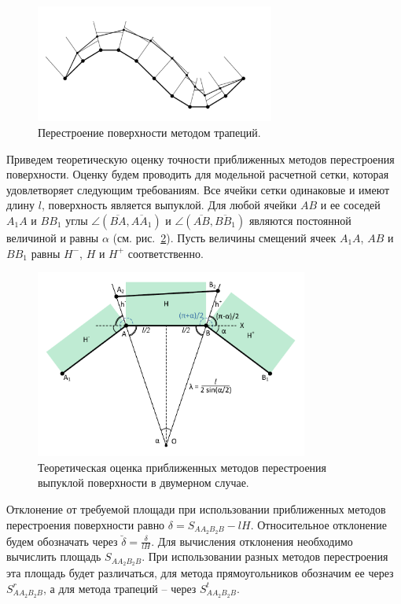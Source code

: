 \begin{figure}[h]
\centering
\includegraphics[width=0.7\textwidth]{pics/text_1_remesh_2d/grid_trapeziums.pdf}
\caption{Перестроение поверхности методом трапеций.}
\label{fig:text_1_remesh_2d_grid_trapeziums}
\end{figure}

Приведем теоретическую оценку точности приближенных методов перестроения поверхности.
Оценку будем проводить для модельной расчетной сетки, которая удовлетворяет следующим требованиям.
Все ячейки сетки одинаковые и имеют длину $l$, поверхность является выпуклой.
Для любой ячейки $AB$ и ее соседей $A_1A$ и $BB_1$ углы $\angle (\overline{BA}, \overline{AA_1})$ и $\angle (\overline{AB}, \overline{BB_1})$ являются постоянной величиной и равны $\alpha$ (см. рис.~\ref{fig:text_1_remesh_2d_theoretical}).
Пусть величины смещений ячеек $A_1A$, $AB$ и $BB_1$ равны $H^{-}$, $H$ и $H^{+}$ соответственно.

\begin{figure}[h]
\centering
\includegraphics[width=0.8\textwidth]{pics/text_1_remesh_2d/theoretical.pdf}
\caption{Теоретическая оценка приближенных методов перестроения выпуклой поверхности в двумерном случае.}
\label{fig:text_1_remesh_2d_theoretical}
\end{figure}

Отклонение от требуемой площади при использовании приближенных методов перестроения поверхности равно $\delta = S_{AA_2B_2B} - lH$.
Относительное отклонение будем обозначать через $\breve{\delta} = \frac{\delta}{lH}$.
Для вычисления отклонения необходимо вычислить площадь $S_{AA_2B_2B}$.
При использовании разных методов перестроения эта площадь будет различаться, для метода прямоугольников обозначим ее через $S_{AA_2B_2B}^r$, а для метода трапеций -- через $S_{AA_2B_2B}^t$.

